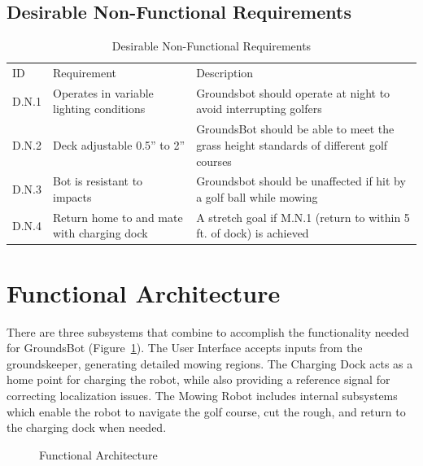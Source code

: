 \documentclass[12pt]{extarticle}
\begin{document}
\subsection{Desirable Non-Functional Requirements}
\begin{center}
  \begin{table}[H]
  	\caption{Desirable Non-Functional Requirements}
  	\label{table: desirable non-functional}

  	\def\arraystretch{1.5}
	\begin{tabularx}{\textwidth}{ lXX }
  	\hline
  	  \sffamily\normalsize{ID} & \sffamily\normalsize{Requirement} &
  	  \sffamily\normalsize{Description} \\
  	  D.N.1 &
  	  Operates in variable lighting conditions &
  	  Groundsbot should operate at night to avoid interrupting golfers\\
  	  D.N.2 &
  	  Deck adjustable 0.5” to 2” &
  	  GroundsBot should be able to meet the grass height standards of different golf courses\\
  	  D.N.3 &
  	  Bot is resistant to impacts &
  	  Groundsbot should be unaffected if hit by a golf ball while mowing\\
  	  D.N.4 &
  	  Return home to and mate with charging dock &
  	  A stretch goal if M.N.1 (return to within 5 ft. of dock) is achieved \\
	\end{tabularx}
  \end{table}
\end{center}


\newpage
\section{Functional Architecture}
  There are three subsystems that combine to accomplish the functionality needed for GroundsBot (Figure~\ref{fig:functional}). The User Interface accepts inputs from the groundskeeper, generating detailed mowing regions. The Charging Dock acts as a home point for charging the robot, while also providing a reference signal for correcting localization issues. The Mowing Robot includes internal subsystems which enable the robot to navigate the golf course, cut the rough, and return to the charging dock when needed.\\
  
\begin{figure}[H]
\centering
\def\svgwidth{\columnwidth}

\caption{Functional Architecture}
\label{fig:functional}
\end{figure}
\end{document}

